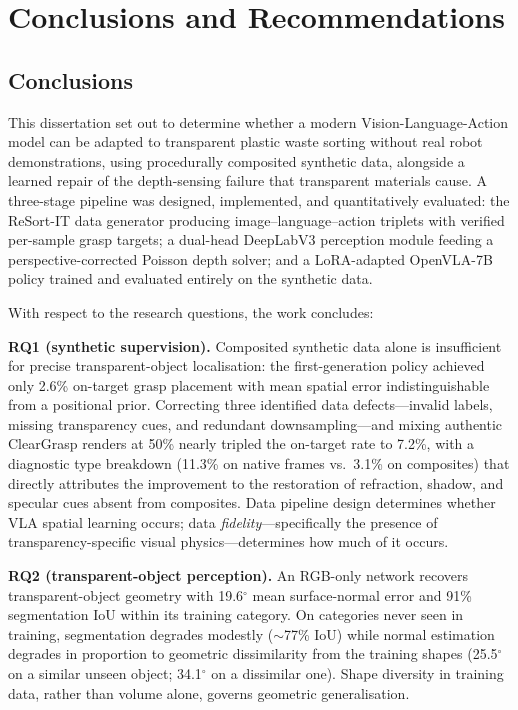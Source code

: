 \chapter{Conclusions and Recommendations}
\label{ch:conclusion}

\section{Conclusions}
\label{sec:conclusions}

This dissertation set out to determine whether a modern Vision-Language-Action model can be adapted to transparent plastic waste sorting without real robot demonstrations, using procedurally composited synthetic data, alongside a learned repair of the depth-sensing failure that transparent materials cause. A three-stage pipeline was designed, implemented, and quantitatively evaluated: the ReSort-IT data generator producing image--language--action triplets with verified per-sample grasp targets; a dual-head DeepLabV3 perception module feeding a perspective-corrected Poisson depth solver; and a LoRA-adapted OpenVLA-7B policy trained and evaluated entirely on the synthetic data.

With respect to the research questions, the work concludes:

\textbf{RQ1 (synthetic supervision).} Composited synthetic data alone is
insufficient for precise transparent-object localisation: the
first-generation policy achieved only 2.6\% on-target grasp placement with
mean spatial error indistinguishable from a positional prior. Correcting
three identified data defects---invalid labels, missing transparency cues,
and redundant downsampling---and mixing authentic ClearGrasp renders at 50\%
nearly tripled the on-target rate to 7.2\%, with a diagnostic type
breakdown (11.3\% on native frames vs.\ 3.1\% on composites) that directly
attributes the improvement to the restoration of refraction, shadow, and
specular cues absent from composites. Data pipeline design determines
whether VLA spatial learning occurs; data \emph{fidelity}---specifically
the presence of transparency-specific visual physics---determines how much
of it occurs.

\textbf{RQ2 (transparent-object perception).} An RGB-only network recovers transparent-object geometry with 19.6$^{\circ}$ mean surface-normal error and 91\% segmentation IoU within its training category. On categories never seen in training, segmentation degrades modestly ($\sim$77\% IoU) while normal estimation degrades in proportion to geometric dissimilarity from the training shapes (25.5$^{\circ}$ on a similar unseen object; 34.1$^{\circ}$ on a dissimilar one). Shape diversity in training data, rather than volume alone, governs geometric generalisation.

